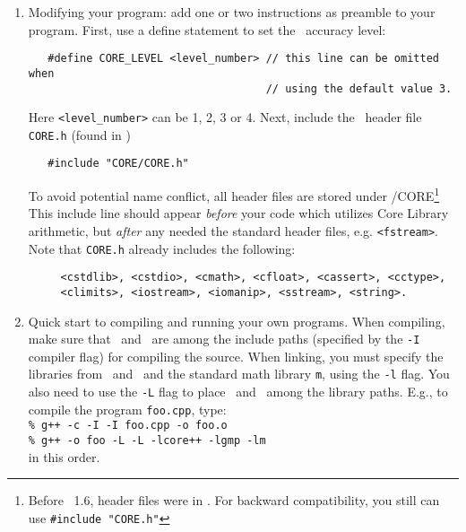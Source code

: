 \documentclass[12pt]{article}
\begin{document}
\begin{enumerate}
\item Modifying your program:
add one or two instructions as preamble to your program.
First, use a define statement to set the \core\ accuracy level:
	\begin{verbatim}
   #define CORE_LEVEL <level_number> // this line can be omitted when
                                     // using the default value 3.
	\end{verbatim}
Here {\tt <level\_number>} can be 1, 2, 3 or  4.
Next, include the \corelib\ header file {\tt CORE.h}
(found in )
	\begin{verbatim}
   #include "CORE/CORE.h"
	\end{verbatim}
To avoid potential name conflict, all header files are stored under
/CORE\footnote{
	Before \corelib\ 1.6, header files were in . 
	For backward compatibility, you still can use
	\texttt{\#include "CORE.h"}
}
This include line should appear {\em before} your code which
utilizes Core Library arithmetic, 
but {\em after} any needed the standard header files, e.g. \verb+<fstream>+.  
Note that \texttt{CORE.h} already includes the following:
\begin{verbatim}
     <cstdlib>, <cstdio>, <cmath>, <cfloat>, <cassert>, <cctype>,
     <climits>, <iostream>, <iomanip>, <sstream>, <string>.
\end{verbatim}

\item Quick start to compiling and running your own programs.
When compiling, make sure that \ and \ are among the
include paths (specified by the {\tt -I} compiler flag)
for compiling the source.
When linking, you must specify the libraries from
\core\ and \gmp\ and the standard math library {\tt m},
using the {\tt -l} flag.  You also need to use the {\tt -L} flag
to place \libdir\ and \gmplibdir\ among the library paths.
E.g., to compile the program \texttt{foo.cpp}, type:
\\ \hspace*{0.2in}
 {\small\tt \% g++ -c -I\  -I\ foo.cpp -o foo.o}
\\ \hspace*{0.2in}
 {\small\tt \% g++ -o foo -L\libdir\  -L\gmplibdir\ -lcore++ -lgmp -lm }
\\ in this order.

\end{enumerate}
\end{document}
